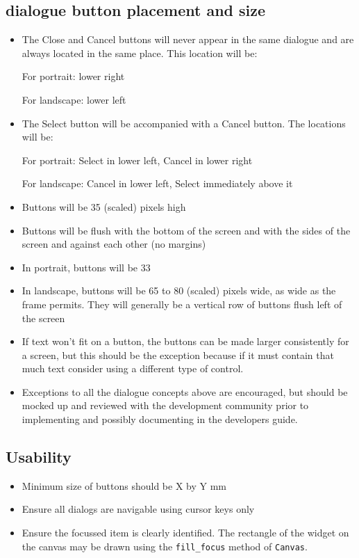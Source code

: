 \documentclass[a4paper,12pt]{refrep}
\begin{document}
\subsection{dialogue button placement and size}
\begin{itemize}
\item The Close and Cancel buttons will never appear in the same dialogue and 
 are always located in the same place.  This location will be:

For portrait: lower right

For landscape: lower left
\item The Select button will be accompanied with a Cancel button.  The locations will be:

For portrait: Select in lower left, Cancel in lower right

For landscape: Cancel in lower left, Select immediately above it
\item Buttons will be 35 (scaled) pixels high
\item Buttons will be flush with the bottom of the screen and with the sides of 
 the screen and against each other (no margins)
\item In portrait, buttons will be 33%
\item In landscape, buttons will be 65 to 80 (scaled) pixels wide, as wide as the 
 frame permits.  They will generally be a vertical row of buttons flush left of the screen
\item If text won't fit on a button, the buttons can be made larger consistently 
 for a screen, but this should be the exception because if it must contain that 
 much text consider using a different type of control.
\item Exceptions to all the dialogue concepts above are encouraged, but should be 
 mocked up and reviewed with the development community prior to implementing and 
 possibly documenting in the developers guide.
\end{itemize}

\subsection{Usability}
\begin{itemize}
\item Minimum size of buttons should be X by Y mm
\item Ensure all dialogs are navigable using cursor keys only
\item Ensure the focussed item is clearly identified.  The rectangle
  of the widget on the canvas may be drawn using the \verb|fill_focus| method
  of \verb|Canvas|.
\end{itemize}
\end{document}
